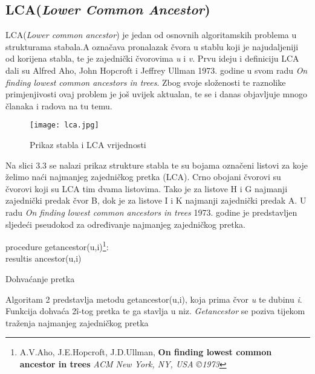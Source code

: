 \documentclass[times, utf8, zavrsni]{fer}
\begin{document}
{\subsection{LCA(\textit{Lower Common Ancestor})}
LCA(\textit{Lower common ancestor}) je jedan od osnovnih algoritamskih problema u strukturama stabala.A označava pronalazak čvora u stablu koji je najudaljeniji od korijena stabla, te je zajednički čvorovima \textit{u} i \textit{v}. Prvu ideju i definiciju LCA dali su Alfred Aho, John Hopcroft i Jeffrey Ullman 1973. godine u svom radu \textit{On finding lowest common ancestors in trees}. Zbog svoje složenosti te raznolike primjenjivosti ovaj problem je još uvijek aktualan, te se i danas objavljuje mnogo članaka i radova na tu temu.
\begin{figure}[!htbp]
	\centering
	\texttt{[image: lca.jpg]}
	\caption{Prikaz stabla i LCA vrijednosti}
	\label{LCA}
\end{figure}

Na slici 3.3 se nalazi prikaz strukture stabla te su bojama označeni listovi za koje želimo naći najmanjeg zajedničkog pretka (LCA). Crno obojani čvorovi su čvorovi koji su LCA tim dvama listovima. Tako je za listove H i G najmanji zajednički predak čvor B, dok je za listove I i K najmanji zajednički predak A. U radu \textit{On finding lowest common ancestors in trees} 1973. godine je predstavljen sljedeći pseudokod za određivanje najmanjeg zajedničkog pretka.
\newline
\newline
\begin{algorithm}[H]
	
	
	procedure getancestor(u,i)\footnote[1]{A.V.Aho, J.E.Hopcroft, J.D.Ullman, \textbf{On finding lowest common ancestor in trees} \textit{ACM New York, NY, USA ©1973}}:\\

	
		resultis ancestor(u,i)\;
	\caption{Dohvaćanje pretka}
	\label{LCA algoritam 1}
\end{algorithm}
Algoritam 2 predstavlja metodu getancestor(u,i), koja prima čvor \textit{u} te dubinu \textit{i}. Funkcija dohvaća 2\^ i-tog pretka te ga stavlja u niz. \textit{Getancestor} se poziva tijekom traženja najmanjeg zajedničkog pretka
\newline
\newline
\begin{algorithm}[H]


\end{algorithm}}
\end{document}
